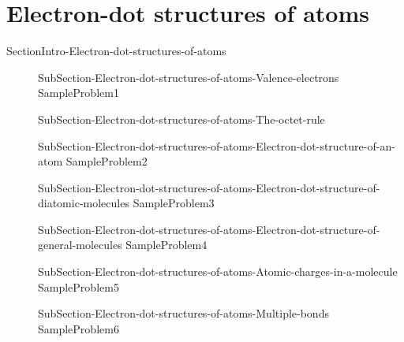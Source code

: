 \documentclass[main.tex]{subfiles}
\newcommand\chapterlabel{ChMIX-bond}\setcounter{figurenewcounter}{0}\setcounter{tablenewcounter}{0}\setcounter{formulanewcounter}{0}
\begin{document}
%	
%			 				 
%
%
%
%






\renewcommand\chapterlabel{Ch-electronicstructure}

\section{Electron-dot structures of atoms}{SectionIntro-Electron-dot-structures-of-atoms}
\sloppy\begin{description}
\item[] {SubSection-Electron-dot-structures-of-atoms-Valence-electrons}
{SampleProblem1}
\item[] {SubSection-Electron-dot-structures-of-atoms-The-octet-rule}
\item[] {SubSection-Electron-dot-structures-of-atoms-Electron-dot-structure-of-an-atom}
{SampleProblem2}
\item[] {SubSection-Electron-dot-structures-of-atoms-Electron-dot-structure-of-diatomic-molecules}
{SampleProblem3}
\item[] {SubSection-Electron-dot-structures-of-atoms-Electron-dot-structure-of-general-molecules}
{SampleProblem4}
\item[] {SubSection-Electron-dot-structures-of-atoms-Atomic-charges-in-a-molecule}
{SampleProblem5}
\item[] {SubSection-Electron-dot-structures-of-atoms-Multiple-bonds} 
{SampleProblem6}
\end{description}
\end{document}
